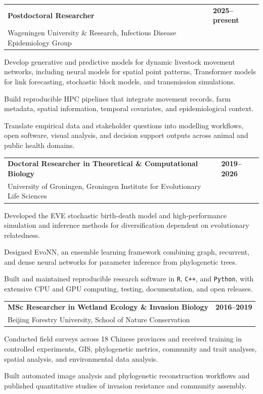 \documentclass[10pt,a4paper]{article}
\makeatletter
\newcommand{\cventry}[4]{%
  \Needspace{9\baselineskip}%
  \begin{tabularx}{\textwidth}{@{}X>{\raggedleft\arraybackslash}p{3.05cm}@{}}
    {\bfseries\color{Ink} #1} & {\bfseries\color{Teal} #2} \\
    {\small\color{Muted} #3} & {}
  \end{tabularx}
  \vspace{0.12em}
  #4
  \vspace{0.48em}
}
\newcommand{\tool}[1]{\texttt{\color{Navy}#1}}
\makeatother
\begin{document}
\cventry
  {Postdoctoral Researcher}
  {2025--present}
  {Wageningen University \& Research, Infectious Disease Epidemiology Group}
  {%
    \begin{cvlist}
      \item Develop generative and predictive models for dynamic livestock movement networks,
      including neural models for spatial point patterns, Transformer models for link forecasting,
      stochastic block models, and transmission simulations.
      \item Build reproducible HPC pipelines that integrate movement records, farm metadata,
      spatial information, temporal covariates, and epidemiological context.
      \item Translate empirical data and stakeholder questions into modelling workflows, open software,
      visual analysis, and decision support outputs across animal and public health domains.
    \end{cvlist}
  }

\cventry
  {Doctoral Researcher in Theoretical \& Computational Biology}
  {2019--2026}
  {University of Groningen, Groningen Institute for Evolutionary Life Sciences}
  {%
    \begin{cvlist}
      \item Developed the EVE stochastic birth-death model and high-performance simulation and
      inference methods for diversification dependent on evolutionary relatedness.
      \item Designed EvoNN, an ensemble learning framework combining graph, recurrent, and dense
      neural networks for parameter inference from phylogenetic trees.
      \item Built and maintained reproducible research software in \tool{R}, \tool{C++}, and
      \tool{Python}, with extensive CPU and GPU computing, testing, documentation, and open releases.
    \end{cvlist}
  }

\cventry
  {MSc Researcher in Wetland Ecology \& Invasion Biology}
  {2016--2019}
  {Beijing Forestry University, School of Nature Conservation}
  {%
    \begin{cvlist}
      \item Conducted field surveys across 18 Chinese provinces and received training in controlled
      experiments, GIS, phylogenetic metrics, community and trait analyses, spatial analysis, and
      environmental data analysis.
      \item Built automated image analysis and phylogenetic reconstruction workflows and published
      quantitative studies of invasion resistance and community assembly.
    \end{cvlist}
  }
\end{document}
